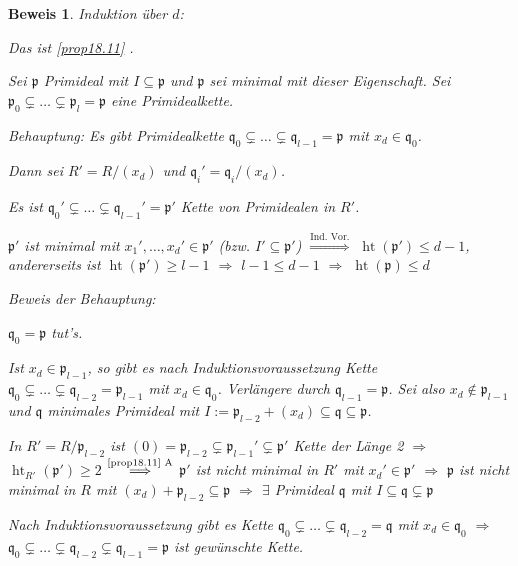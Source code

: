 \documentclass[a4paper, 12pt, numbers=noendperiod, chapterprefix=true, headsepline]{scrbook}
\theoremstyle{break}
\theoremstyle{nonumberbreak}
\newtheorem{Bew}{Beweis}
\theoremstyle{nonumberplain}
\DeclareMathOperator{\Ht}{ht}
\newcommand{\frakp}{\mathfrak{p}}
\newcommand{\frakq}{\mathfrak{q}}
\begin{document}
\begin{Bew}
Induktion \"uber $d$:\begin{description}[\setlabelstyle{\normalfont}]
\item[$d=1$:]
	Das ist \ref{prop18.11} .
\item[$d\ge2$:]
	Sei $\frakp$ Primideal mit $I\subseteq \frakp$ und $\frakp$ sei minimal mit dieser Eigenschaft. Sei $\frakp_0\subsetneq\ldots \subsetneq \frakp_l= \frakp$ eine Primidealkette.
	
	\emph{Behauptung:} Es gibt Primidealkette $\frakq_0\subsetneq\ldots \subsetneq\frakq_{l-1}=\frakp$ mit $x_d\in\frakq_0$.
	
	Dann sei $R'=R/(x_d)$ und $\frakq_i'=\frakq_i/(x_d)$.
	
	Es ist $\frakq_0'\subsetneq\ldots \subsetneq\frakq_{l-1}'=\frakp'$ Kette von Primidealen in $R'$.
	
	$\frakp'$ ist minimal mit $x_1',\ldots ,x_d'\in \frakp'$ (bzw. $I'\subseteq\frakp'$) $\overset{\text{Ind. Vor.}}{\Longrightarrow}$ $\Ht(\frakp')\le d-1$, andererseits ist $\Ht(\frakp')\ge l-1$ $\Rightarrow $ $l-1 \le d-1$ $\Rightarrow $ $\Ht(\frakp)\le d$
\end{description}
\emph{Beweis der Behauptung:}\begin{description}[\setlabelstyle{\normalfont}]
\item[$l=1$:]
	$\frakq_0=\frakp$ tut's.
\item[$l\ge2$:]
	Ist $x_d\in \frakp_{l-1}$, so gibt es nach Induktionsvoraussetzung Kette $\frakq_0\subsetneq\ldots \subsetneq\frakq_{l-2}=\frakp_{l-1}$ mit $x_d\in \frakq_0$. Verl\"angere durch $\frakq_{l-1}=\frakp$. Sei also $x_d\notin \frakp_{l-1}$ und $\frakq$ minimales Primideal mit $I:=\frakp_{l-2}+(x_d)\subseteq\frakq\subseteq\frakp$.
	
	In $R'=R/\frakp_{l-2}$ ist $(0) = \frakp_{l-2}\subsetneq\frakp_{l-1}'\subsetneq\frakp'$ Kette der L\"ange 2 $\Rightarrow$ $\Ht_{R'}(\frakp')\ge2$ $\overset{\text{\ref{prop18.11} A}}{\Longrightarrow}$ $\frakp'$ ist \emph{nicht} minimal in $R'$ mit $x_d'\in\frakp'$ $\Rightarrow $ $\frakp$ ist nicht minimal in $R$ mit $(x_d)+\frakp_{l-2}\subseteq\frakp$ $\Rightarrow $ $\exists$ Primideal $\frakq$ mit $I\subseteq\frakq\subsetneq\frakp$
	
	Nach Induktionsvoraussetzung gibt es Kette $\frakq_0\subsetneq\ldots \subsetneq\frakq_{l-2}=\frakq$ mit $x_d\in\frakq_0$ $\Rightarrow $ $\frakq_0\subsetneq\ldots \subsetneq\frakq_{l-2}\subsetneq\frakq_{l-1}=\frakp$ ist gew\"unschte Kette.
\end{description}\end{Bew}
\end{document}
